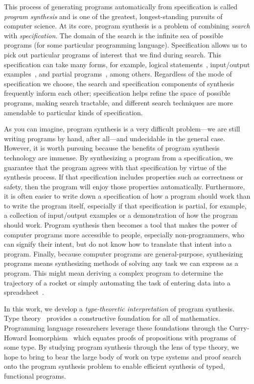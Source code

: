 This process of generating programs automatically from specification is called \emph{program synthesis} and is one of the greatest, longest-standing pursuits of computer science.
At its core, program synthesis is a problem of combining \emph{search} with \emph{specification}.
The domain of the search is the infinite sea of possible programs (for some particular programming language).
Specification allows us to pick out particular programs of interest that we find during search.
This specification can take many forms, for example, logical statements~\citep{green-ijcai-1969, manna-tse-1979}, input/output examples~\citep{summers-popl-1976, kitzelmann-thesis-2010, albarghouthi-cav-2013, feser-pldi-2015}, and partial programs~\citep{solar-lezama-thesis-2008, alur-fmcad-2013, singh-pldi-2013}, among others.
Regardless of the mode of specification we choose, the search and specification components of synthesis frequently inform each other; specification helps refine the space of possible programs, making search tractable, and different search techniques are more amendable to particular kinds of specification.

As you can imagine, program synthesis is a very difficult problem---we are still writing programs by hand, after all---and undecidable in the general case.
However, it is worth pursuing because the benefits of program synthesis technology are immense.
By synthesizing a program from a specification, we guarantee that the program agrees with that specification by virtue of the synthesis process.
If that specification includes properties such as correctness or safety, then the program will enjoy those properties automatically.
Furthermore, it is often easier to write down a specification of how a program should work than to write the program itself, especially if that specification is partial, for example, a collection of input/output examples or a demonstration of how the program should work.
Program synthesis then becomes a tool that makes the power of computer programs more accessible to people, especially non-programmers, who can signify their intent, but do not know how to translate that intent into a program.
Finally, because computer programs are general-purpose, synthesizing programs means synthesizing methods of solving any task we can express as a program.
This might mean deriving a complex program to determine the trajectory of a rocket or simply automating the task of entering data into a spreadsheet~\citep{gulwani-popl-2011}.

In this work, we develop a \emph{type-theoretic interpretation} of program synthesis.
Type theory~\citep{martin-lof-1984} provides a constructive foundation for all of mathematics.
Programming language researchers leverage these foundations through the Curry-Howard Isomorphism~\citep{william-curry-1980} which equates proofs of propositions with programs of some type.
By studying program synthesis through the lens of type theory, we hope to bring to bear the large body of work on type systems and proof search onto the program synthesis problem to enable efficient synthesis of typed, functional programs.

